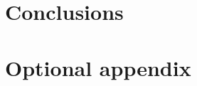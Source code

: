 \documentclass[12pt]{report}
\begin{document}
%
%
%
%
%
%
%


    \chapter{Conclusions}


    \appendix


    \chapter{Optional appendix}

    \printbibliography
\end{document}
